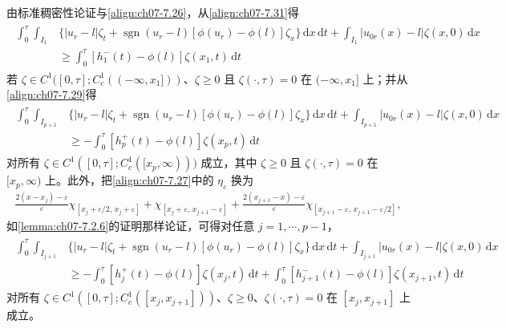 \documentclass[../../main.tex]{subfiles}%
\begin{document}
\begin{remark}\label{remark:ch07-7.2.4}
由标准稠密性论证与\eqref{align:ch07-7.26}，从\eqref{align:ch07-7.31}得
\begin{align}
\begin{aligned}
\int_0^\tau\int_{I_1}&\{|u_r-l|\zeta_t+\operatorname{sgn}(u_r-l)[\phi(u_r)-\phi(l)]\zeta_x\}\,\mathrm{d}x\,\mathrm{d}t
+\int_{I_1}|u_{0r}(x)-l|\zeta(x,0)\,\mathrm{d}x\\
&\geqslant\int_0^\tau[h_1^-(t)-\phi(l)]\zeta(x_1,t)\,\mathrm{d}t
\end{aligned} 
\label{align:ch07-7.32}
\end{align}
若 $\zeta\in C^1([0,\tau];C^1_c((-\infty,x_1]))$、$\zeta\geqslant0$ 且 $\zeta(\cdot,\tau)=0$ 在 $(-\infty,x_1]$ 上；并从\eqref{align:ch07-7.29}得
\begin{align*}
\begin{aligned}
\int_0^\tau\int_{I_{p+1}}&\{|u_r-l|\zeta_t+\operatorname{sgn}(u_r-l)[\phi(u_r)-\phi(l)]\zeta_x\}\,\mathrm{d}x\,\mathrm{d}t
+\int_{I_{p+1}}|u_{0r}(x)-l|\zeta(x,0)\,\mathrm{d}x\\
&\geqslant-\int_0^\tau[h_p^+(t)-\phi(l)]\zeta(x_p,t)\,\mathrm{d}t
\end{aligned}
\end{align*}
对所有 $\zeta\in C^1([0,\tau];C^1_c([x_p,\infty)))$ 成立，其中 $\zeta\geqslant0$ 且 $\zeta(\cdot,\tau)=0$ 在 $[x_p,\infty)$ 上。此外，把\eqref{align:ch07-7.27}中的 $\eta_\varepsilon$ 换为
\begin{align*}
\frac{2(x-x_j)-\varepsilon}{\varepsilon}\chi_{[x_j+\varepsilon/2,\,x_j+\varepsilon]}+\chi_{[x_j+\varepsilon,\,x_{j+1}-\varepsilon]}+\frac{2(x_{j+1}-x)-\varepsilon}{\varepsilon}\chi_{[x_{j+1}-\varepsilon,\,x_{j+1}-\varepsilon/2]},
\end{align*}
如\cref{lemma:ch07-7.2.6}的证明那样论证，可得对任意 $j=1,\cdots,p-1$，
\begin{align*}
\begin{aligned}
\int_0^\tau\int_{I_{j+1}}&\{|u_r-l|\zeta_t+\operatorname{sgn}(u_r-l)[\phi(u_r)-\phi(l)]\zeta_x\}\,\mathrm{d}x\,\mathrm{d}t
+\int_{I_{j+1}}|u_{0r}(x)-l|\zeta(x,0)\,\mathrm{d}x\\
&\geqslant-\int_0^\tau[h_j^+(t)-\phi(l)]\zeta(x_j,t)\,\mathrm{d}t
+\int_0^\tau[h_{j+1}^-(t)-\phi(l)]\zeta(x_{j+1},t)\,\mathrm{d}t
\end{aligned}
\end{align*}
对所有 $\zeta\in C^1([0,\tau];C^1_c([x_j,x_{j+1}]))$、$\zeta\geqslant0$、$\zeta(\cdot,\tau)=0$ 在 $[x_j,x_{j+1}]$ 上成立。
\end{remark}
\end{document}
